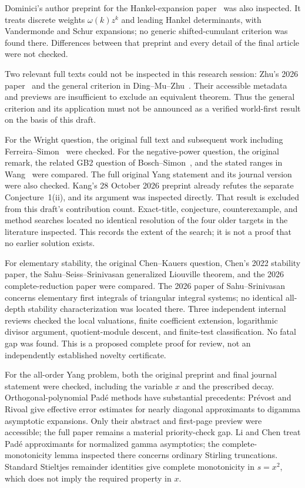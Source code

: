 \documentclass[11pt,a4paper]{article}
\theoremstyle{definition}
\theoremstyle{remark}
\numberwithin{equation}{section}
\begin{document}
Dominici's author preprint for the Hankel-expansion
paper~\cite{Dominici2020} was also inspected. It treats discrete weights
$\omega(k)z^k$ and leading Hankel determinants, with Vandermonde and Schur
expansions; no generic shifted-cumulant criterion was found there. Differences
between that preprint and every detail of the final article were not checked.

Two relevant full texts could not be inspected in this research session:
Zhu's 2026 paper~\cite{Zhu2026} and the general criterion in
Ding--Mu--Zhu~\cite{DingMuZhu2026}. Their accessible metadata and previews are
insufficient to exclude an equivalent theorem. Thus the general criterion
and its application must not be announced as a verified world-first result
on the basis of this draft.

For the Wright question, the original full text and subsequent work
including Ferreira--Simon~\cite{FerreiraSimon2025} were checked. For the
negative-power question, the original remark, the related GB2 question of
Bosch--Simon~\cite{BoschSimon2015}, and the stated ranges in
Wang~\cite{Wang2024,Wang2026} were compared. The full original Yang
statement and its journal version were also checked. Kang's 28 October
2026 preprint \cite{Kang2026} already refutes the separate
Conjecture~1(ii), and its argument was inspected directly. That result
is excluded from this draft's contribution count. Exact-title,
conjecture, counterexample, and method searches located no identical
resolution of the four older targets in the literature inspected. This records
the extent of the search; it is not a proof that no earlier solution
exists.

For elementary stability, the original Chen--Kauers question,
Chen's 2022 stability paper, the Sahu--Seiss--Srinivasan generalized
Liouville theorem, and the 2026 complete-reduction paper were compared.
The 2026 paper of Sahu--Srinivasan~\cite{stab:SS2026} concerns elementary
first integrals of triangular integral systems; no identical all-depth
stability characterization was located there. Three independent internal
reviews checked the local valuations, finite coefficient extension,
logarithmic divisor argument, quotient-module descent, and finite-test
classification. No fatal gap was found. This is a proposed complete
proof for review, not an independently established novelty certificate.

For the all-order Yang problem, both the original preprint and final
journal statement were checked, including the variable $x$ and the
prescribed decay. Orthogonal-polynomial Pad\'e methods have substantial
precedents: Pr\'evost and Rivoal \cite{PrevostRivoal2021} give effective
error estimates for nearly diagonal approximants to digamma asymptotic
expansions. Only their abstract and first-page preview were accessible;
the full paper remains a material priority-check gap. Li and Chen
\cite{LiChen2017} treat Pad\'e approximants for normalized gamma
asymptotics; the complete-monotonicity lemma inspected there concerns
ordinary Stirling truncations. Standard Stieltjes remainder identities
give complete monotonicity in $s=x^2$, which does not imply the required
property in $x$.
\end{document}

